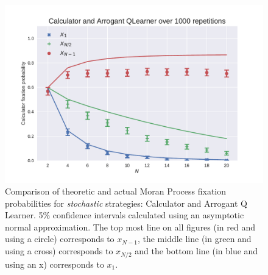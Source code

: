 \documentclass[10pt,letterpaper]{article}
\begin{document}
\begin{figure}[!hbtp]
    \centering
    \includegraphics[width=.95\columnwidth]{./Calculator_v_Arrogant_QLearner.pdf}
    \caption{Comparison of theoretic and actual Moran Process
             fixation probabilities for \textit{stochastic} strategies:
             Calculator and Arrogant Q Learner. 5\% confidence intervals calculated using an asymptotic
     normal approximation.
The top most line on all figures (in red and using a circle) corresponds to
\(x_{N-1}\), the middle line (in green and using a cross) corresponds to
\(x_{N/2}\) and the bottom line (in blue and using an x) corresponds to
\(x_{1}\).}
    \label{fig:comparison_stochastic}
\end{figure}
\end{document}
